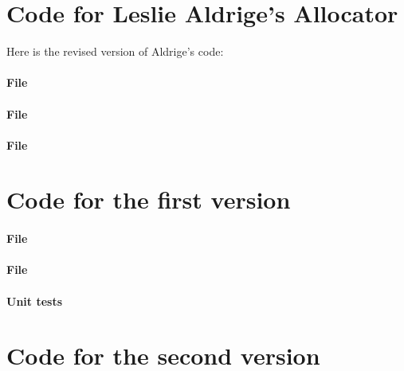 \section{Code for Leslie Aldrige's Allocator}
\label{app:leslie}

Here is the revised version of Aldrige's code:

\paragraph{File }


\paragraph{File }


\paragraph{File }




\section{Code for the first version}
\label{app:first}

\paragraph{File }


\paragraph{File }


\paragraph{Unit tests}





\section{Code for the second version}
\label{app:second}

